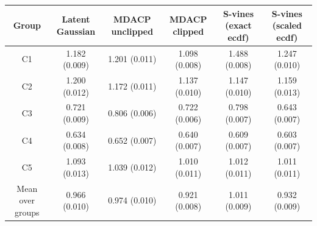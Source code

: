 \begin{tabular}{|c|c|c|c|c|c|}
\hline
Group & Latent Gaussian & MDACP unclipped & MDACP clipped & S-vines (exact ecdf) & S-vines (scaled ecdf) \\ \hline
C1 & 1.182 (0.009) & 1.201 (0.011) & 1.098 (0.008) & 1.488 (0.008) & 1.247 (0.010) \\
C2 & 1.200 (0.012) & 1.172 (0.011) & 1.137 (0.010) & 1.147 (0.010) & 1.159 (0.013) \\
C3 & 0.721 (0.009) & 0.806 (0.006) & 0.722 (0.006) & 0.798 (0.007) & 0.643 (0.007) \\
C4 & 0.634 (0.008) & 0.652 (0.007) & 0.640 (0.007) & 0.609 (0.007) & 0.603 (0.007) \\
C5 & 1.093 (0.013) & 1.039 (0.012) & 1.010 (0.011) & 1.012 (0.011) & 1.011 (0.011) \\
\hline Mean over groups & 0.966 (0.010) & 0.974 (0.010) & 0.921 (0.008) & 1.011 (0.009) & 0.932 (0.009) \\
\hline
\end{tabular}
